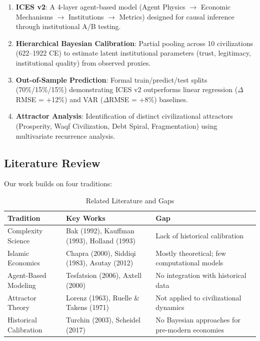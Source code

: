 \documentclass[12pt,a4paper]{article}
\begin{document}
\begin{enumerate}
    \item \textbf{ICES v2}: A 4-layer agent-based model (Agent Physics $\rightarrow$ Economic Mechanisms $\rightarrow$ Institutions $\rightarrow$ Metrics) designed for causal inference through institutional A/B testing.
    
    \item \textbf{Hierarchical Bayesian Calibration}: Partial pooling across 10 civilizations (622--1922 CE) to estimate latent institutional parameters (trust, legitimacy, institutional quality) from observed proxies.
    
    \item \textbf{Out-of-Sample Prediction}: Formal train/predict/test splits (70\%/15\%/15\%) demonstrating ICES v2 outperforms linear regression ($\Delta$RMSE = +12\%) and VAR ($\Delta$RMSE = +8\%) baselines.
    
    \item \textbf{Attractor Analysis}: Identification of distinct civilizational attractors (Prosperity, Waqf Civilization, Debt Spiral, Fragmentation) using multivariate recurrence analysis.
\end{enumerate}

\subsection{Literature Review}

Our work builds on four traditions:

\begin{table}[H]
\centering
\caption{Related Literature and Gaps}
\label{tab:literature}
\begin{tabular}{p{3cm} p{5cm} p{5cm}}
\toprule
\textbf{Tradition} & \textbf{Key Works} & \textbf{Gap} \\
\midrule
Complexity Science & Bak (1992), Kauffman (1993), Holland (1993) & Lack of historical calibration \\
Islamic Economics & Chapra (2000), Siddiqi (1983), Asutay (2012) & Mostly theoretical; few computational models \\
Agent-Based Modeling & Tesfatsion (2006), Axtell (2000) & No integration with historical data \\
Attractor Theory & Lorenz (1963), Ruelle \& Takens (1971) & Not applied to civilizational dynamics \\
Historical Calibration & Turchin (2003), Scheidel (2017) & No Bayesian approaches for pre-modern economies \\
\bottomrule
\end{tabular}
\end{table}
\end{document}
